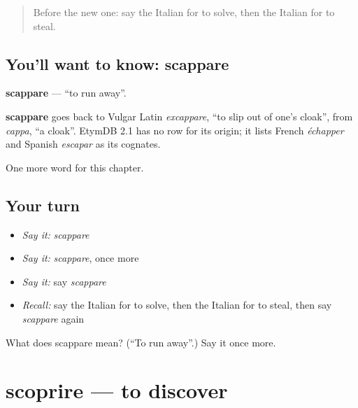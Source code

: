 \label{lesson:IT-C181-scappare}



\begin{quote}
Before the new one: say the Italian for to solve, then the Italian for to steal.
\end{quote}

\subsection*{You'll want to know: scappare}
\textbf{scappare} — \textquotedblleft{}to run away\textquotedblright{}.

\begin{cousinweb}
\textbf{scappare} goes back to Vulgar Latin \emph{excappare}, \textquotedblleft{}to slip out of one's cloak\textquotedblright{}, from \emph{cappa}, \textquotedblleft{}a cloak\textquotedblright{}. EtymDB 2.1 has no row for its origin; it lists French \emph{échapper} and Spanish \emph{escapar} as its cognates.
\end{cousinweb}

\begin{grammarlens}[title={What you've built}]
One more word for this chapter.
\end{grammarlens}

\subsection*{Your turn}
\begin{itemize}
\raggedright
  \item \emph{Say it:} \emph{scappare}
  \item \emph{Say it:} \emph{scappare}, once more
  \item \emph{Say it:} say \emph{scappare}
  \item \emph{Recall:} say the Italian for to solve, then the Italian for to steal, then say \emph{scappare} again
\end{itemize}

\begin{tcolorbox}[breakable,colback=teal!4,colframe=teal!35!black,title={Before you move on}]
What does scappare mean? (\textquotedblleft{}To run away\textquotedblright{}.) Say it once more.
\end{tcolorbox}
\section[scoprire]{scoprire — to discover}

